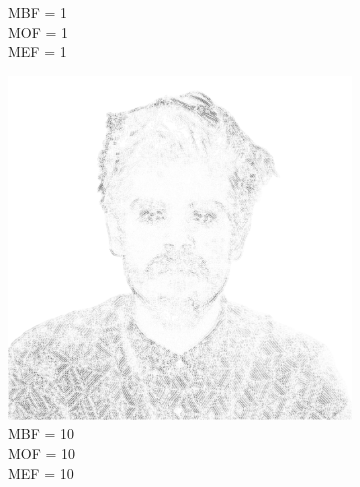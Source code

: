 \begin{figure}[htb]
\begin{subfigure}{0.32\textwidth}
        \caption{MBF = 1 \\ MOF = 1 \\ MEF = 1}
        \label{mine-param-taco-b}
    \end{subfigure}
    \begin{subfigure}{0.32\textwidth}
        \centering
        \includegraphics[width = \textwidth]{img/4-mine/taco-mask/taco_mask_c20_inv0_bg10_obj10_ed10.png}
        \caption{MBF = 10 \\ MOF = 10 \\ MEF = 10}
        \label{mine-param-taco-c}
    \end{subfigure}\\
    \begin{subfigure}{0.32\textwidth}
        \centering

\end{subfigure}
\end{figure}
